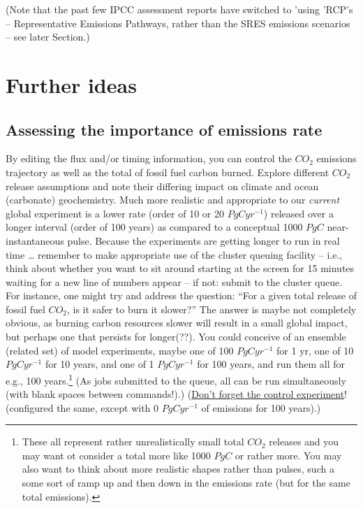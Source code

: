 \documentclass[11pt,fleqn]{book} %
\begin{document}
(Note that the past few IPCC assessment reports have switched to 'using 'RCP's -- Representative Emissions Pathways, rather than the SRES emissions scenarios -- see later Section.)


\newpage


\section{Further ideas}


\subsection{Assessing the importance of emissions rate}

By editing the flux and/or timing information, you can control the \(CO_{2}\) emissions trajectory as well as the total of fossil fuel carbon burned. Explore different \(CO_{2}\) release assumptions and note their differing impact on climate and ocean (carbonate) geochemistry. Much more realistic and appropriate to our \textit{current} global experiment is a lower rate (order of 10 or 20 \(PgCyr^{-1}\)) released over a longer interval (order of 100 years) as compared to a conceptual 1000 \(PgC\) near-instantaneous pulse. Because the experiments are getting longer to run in real time … remember to make appropriate use of the cluster queuing facility – i.e., think about whether you want to sit around starting at the screen for 15 minutes waiting for a new line of numbers appear – if not: submit to the cluster queue. For instance, one might try and address the question: “For a given total release of  fossil fuel \(CO_{2}\), is it safer to burn it slower?” The answer is maybe not completely obvious, as burning carbon resources slower will result in a small global impact, but perhaps one that persists for longer(??). You could conceive of an ensemble (related set) of model experiments, maybe one of 100 \(PgCyr^{-1}\) for 1 yr, one of 10 \(PgCyr^{-1}\) for 10 years, and one of 1 \(PgCyr^{-1}\) for 100 years, and run them all for e.g., 100 years.\footnote{These all represent rather unrealistically small total \(CO_{2}\) releases and you may want ot consider a total more like 1000 \(PgC\) or rather more. You may also want to think about more realistic shapes rather than pulses, such a some sort of ramp up and then down in the emissions rate (but for the same total emissions).} (As jobs submitted to the queue, all can be run simultaneously (with blank spaces between commands!).) (\uline{Don’t forget the control experiment}! (configured the same, except with 0 \(PgCyr^{-1}\) of emissions for 100 years).)
\end{document}
